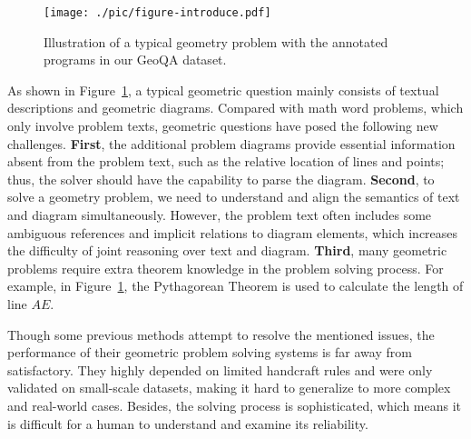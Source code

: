 \documentclass[11pt,a4paper]{article}
\begin{document}
\begin{figure}[t]
\begin{center}
 \texttt{[image: ./pic/figure-introduce.pdf]}
\end{center}
  \caption{Illustration of a typical geometry problem with the annotated programs in our GeoQA dataset. 
}
\label{fig:introduce}
\end{figure}

As shown in Figure~\ref{fig:introduce}, a typical geometric question mainly consists of textual descriptions and geometric diagrams.
Compared with math word problems, which only involve problem texts, geometric questions have posed the following new challenges. {\bf{First}}, the additional problem diagrams provide essential information absent from the problem text, such as the relative location of lines and points; thus, the solver should have the capability to parse the diagram. {\bf{Second}}, to solve a geometry problem, we need to understand and align the semantics of text and diagram simultaneously.  However, the problem text often includes some ambiguous references and implicit relations to diagram elements, which increases the difficulty of joint reasoning over text and diagram. {\bf{Third}}, many geometric problems require extra theorem knowledge in the problem solving process. For example, in Figure~\ref{fig:introduce}, the Pythagorean Theorem is used to calculate the length of line $AE$.
















Though some previous methods \cite{seo2014diagram,seo2015solving,sachan2017textbooks,sachan2020discourse,sachan2020knowledge} attempt to resolve the mentioned issues, the performance of their geometric problem solving systems is far away from satisfactory. They highly depended on limited handcraft rules and were only validated on small-scale datasets, making it hard to generalize to more complex and real-world cases. Besides, the solving process is sophisticated, which means it is difficult for a human to understand and examine its reliability.
\end{document}
